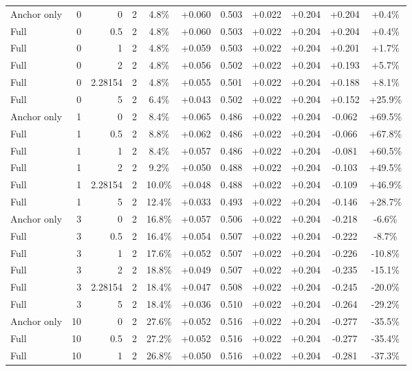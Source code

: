 \begin{table}[htbp]
\begin{tabular}{lrrrccccccc}
Anchor only & 0 & 0 & 2 & 4.8\% & +0.060 & 0.503 & +0.022 & +0.204 & +0.204 & +0.4\% \\
Full & 0 & 0.5 & 2 & 4.8\% & +0.060 & 0.503 & +0.022 & +0.204 & +0.204 & +0.4\% \\
Full & 0 & 1 & 2 & 4.8\% & +0.059 & 0.503 & +0.022 & +0.204 & +0.201 & +1.7\% \\
Full & 0 & 2 & 2 & 4.8\% & +0.056 & 0.502 & +0.022 & +0.204 & +0.193 & +5.7\% \\
Full & 0 & 2.28154 & 2 & 4.8\% & +0.055 & 0.501 & +0.022 & +0.204 & +0.188 & +8.1\% \\
Full & 0 & 5 & 2 & 6.4\% & +0.043 & 0.502 & +0.022 & +0.204 & +0.152 & +25.9\% \\
Anchor only & 1 & 0 & 2 & 8.4\% & +0.065 & 0.486 & +0.022 & +0.204 & -0.062 & +69.5\% \\
Full & 1 & 0.5 & 2 & 8.8\% & +0.062 & 0.486 & +0.022 & +0.204 & -0.066 & +67.8\% \\
Full & 1 & 1 & 2 & 8.4\% & +0.057 & 0.486 & +0.022 & +0.204 & -0.081 & +60.5\% \\
Full & 1 & 2 & 2 & 9.2\% & +0.050 & 0.488 & +0.022 & +0.204 & -0.103 & +49.5\% \\
Full & 1 & 2.28154 & 2 & 10.0\% & +0.048 & 0.488 & +0.022 & +0.204 & -0.109 & +46.9\% \\
Full & 1 & 5 & 2 & 12.4\% & +0.033 & 0.493 & +0.022 & +0.204 & -0.146 & +28.7\% \\
Anchor only & 3 & 0 & 2 & 16.8\% & +0.057 & 0.506 & +0.022 & +0.204 & -0.218 & -6.6\% \\
Full & 3 & 0.5 & 2 & 16.4\% & +0.054 & 0.507 & +0.022 & +0.204 & -0.222 & -8.7\% \\
Full & 3 & 1 & 2 & 17.6\% & +0.052 & 0.507 & +0.022 & +0.204 & -0.226 & -10.8\% \\
Full & 3 & 2 & 2 & 18.8\% & +0.049 & 0.507 & +0.022 & +0.204 & -0.235 & -15.1\% \\
Full & 3 & 2.28154 & 2 & 18.4\% & +0.047 & 0.508 & +0.022 & +0.204 & -0.245 & -20.0\% \\
Full & 3 & 5 & 2 & 18.4\% & +0.036 & 0.510 & +0.022 & +0.204 & -0.264 & -29.2\% \\
Anchor only & 10 & 0 & 2 & 27.6\% & +0.052 & 0.516 & +0.022 & +0.204 & -0.277 & -35.5\% \\
Full & 10 & 0.5 & 2 & 27.2\% & +0.052 & 0.516 & +0.022 & +0.204 & -0.277 & -35.4\% \\
Full & 10 & 1 & 2 & 26.8\% & +0.050 & 0.516 & +0.022 & +0.204 & -0.281 & -37.3\% \\

\end{tabular}
\end{table}
